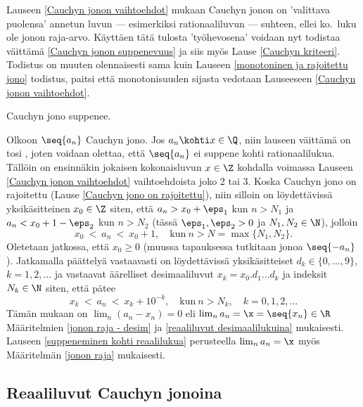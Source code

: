 Lauseen \ref{Cauchyn jonon vaihtoehdot} mukaan Cauchyn jonon on 'valittava puolensa' annetun
luvun --- esimerkiksi rationaaliluvun --- suhteen, ellei ko.\ luku ole jonon raja-arvo.
Käyttäen tätä tulosta 'työhevosena' voidaan nyt todistaa väittämä
\eqref{Cauchyn jonon suppenevuus} ja siis myös Lause \ref{Cauchyn kriteeri}. Todistus on
muuten olennaisesti sama kuin Lauseen \ref{monotoninen ja rajoitettu jono} todistus, paitsi
että monotonisuuden sijasta vedotaan Lauseeseen \ref{Cauchyn jonon vaihtoehdot}. 
\begin{*Lause} \label{Cauchyn jono suppenee} Cauchyn jono suppenee. \end{*Lause}
\tod Olkoon $\seq{a_n}$ Cauchyn jono. Jos $a_n \kohti x\in\Q$, niin lauseen väittämä on tosi
, joten voidaan olettaa, että $\seq{a_n}$ ei suppene kohti rationaalilukua. Tällöin on
ensinnäkin jokaisen kokonaisluvun $x \in \Z$ kohdalla voimassa Lauseen
\ref{Cauchyn jonon vaihtoehdot} vaihtoehdoista joko 2 tai 3. Koska Cauchyn jono on rajoitettu
(Lause \ref{Cauchyn jono on rajoitettu}), niin silloin on löydettävissä yksikäsitteinen
$x_0 \in \Z$ siten, että $a_n > x_0 + \eps_1$ kun $n > N_1$ ja $a_n < x_0 + 1 - \eps_2$ kun
$n > N_2$ (tässä $\eps_1,\eps_2 > 0$ ja $N_1,N_2 \in \N$), jolloin 
\[
x_0\ <\ a_n\ <\ x_0 + 1, \quad \text{kun}\ n>N = \max \{N_1,N_2\}.
\]
Oletetaan jatkossa, että $x_0 \ge 0$ (muussa tapauksessa tutkitaan jonoa $\seq{-a_n}$).
Jatkamalla päättelyä vastaavasti on löydettävissä yksikäsitteiset
$d_k \in \{0,\ldots,9\}$, $ k = 1,2,\ldots$ ja vastaavat äärelliset desimaaliluvut 
$x_k = x_0.d_1 \ldots d_k$ ja indeksit $N_k \in \N$ siten, että pätee
\[
x_k\ <\ a_n\ <\ x_k + 10^{-k}, \quad \text{kun}\ n>N_k, \quad k=0,1,2,\ldots
\]
Tämän mukaan on $\lim_n (a_n-x_n)=0$ eli $\lim_n a_n =\x=\seq{x_n}\in\R$ Määritelmien
\ref{jonon raja - desim} ja \ref{reaaliluvut desimaalilukuina} mukaisesti. Lauseen
\ref{suppeneminen kohti reaalilukua} perusteella $\lim_na_n=\x$ myös Määritelmän
\ref{jonon raja} mukaisesti. \loppu

\subsection{Reaaliluvut Cauchyn jonoina}

